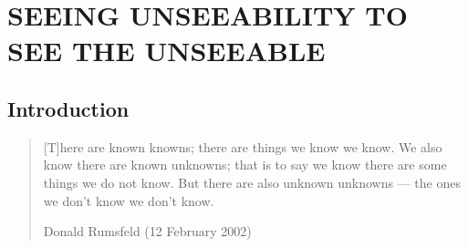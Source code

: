 \chapter{SEEING UNSEEABILITY TO SEE THE UNSEEABLE}
\label{chapter:acs2012a}

\section{Introduction}
\label{sec-ll2:introduction}

\begin{quote}
  [T]here are known knowns; there are things we know we know.
  We also know there are known unknowns; that is to say we know there are some
  things we do not know.
  But there are also unknown unknowns --- the ones we don't know we don't know.
  \par\vspace*{-3ex}
  \begin{flushright}
    Donald Rumsfeld (12 February 2002)
  \end{flushright}
  \par\vspace*{-4ex}
\end{quote}

